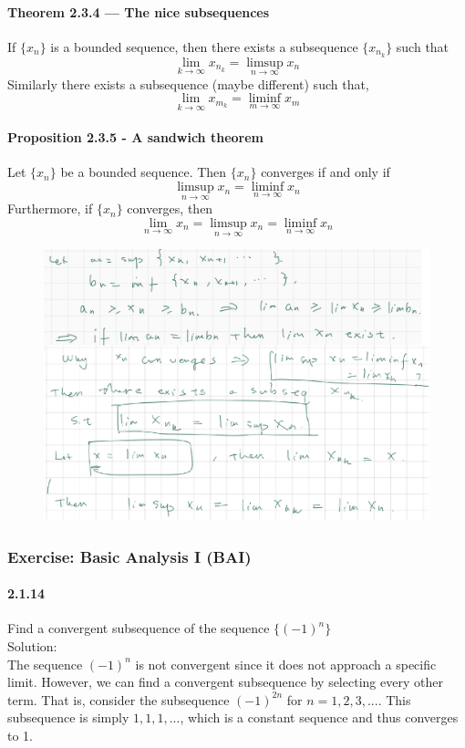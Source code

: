 \documentclass{article}
\begin{document}
\paragraph{Theorem 2.3.4 — The nice subsequences}
If $\{x_n\}$  is a bounded sequence, then there exists a subsequence $\{x_{n_k}\}$ such that
$$\lim_{k\to \infty}x_{n_k}=\limsup_{n\to \infty} x_n$$
Similarly there exists a subsequence (maybe different) such that,
$$\lim_{k\to \infty}x_{m_k}=\liminf_{m\to \infty} x_m$$
\paragraph{Proposition 2.3.5 - A sandwich theorem}
Let $\{x_n\}$ be a bounded sequence. Then $\{x_n\}$ converges if and only if $$\limsup_{n\to \infty}x_n=\liminf_{n\to \infty}x_n$$
Furthermore, if $\{x_n\}$ converges, then
$$\lim_{n\to \infty}x_n=\limsup_{n\to \infty}x_n=\liminf_{n\to \infty}x_n$$
\begin{figure}[H]
    \centering
    \includegraphics{0132}
\end{figure}
\subsubsection{Exercise: Basic Analysis I (BAI)}
\paragraph{2.1.14}
Find a convergent subsequence of the sequence $\{(-1)^n\}$\\
Solution:\\
The sequence ${(-1)^n}$ is not convergent since it does not approach a specific limit. However, we can find a convergent subsequence by selecting every other term. That is, consider the subsequence ${(-1)^{2n}}$ for $n=1,2,3,...$. This subsequence is simply ${1,1,1,...}$, which is a constant sequence and thus converges to 1.
\end{document}
